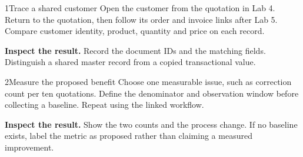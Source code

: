 
\begin{labquestion}{1}{Trace a shared customer}
Open the customer from the quotation in Lab 4. Return to the quotation, then follow its order and invoice links after Lab 5. Compare customer identity, product, quantity and price on each record.
\end{labquestion}
\begin{labanswer}\textbf{Inspect the result.} Record the document IDs and the matching fields. Distinguish a shared master record from a copied transactional value.\end{labanswer}

\begin{labquestion}{2}{Measure the proposed benefit}
Choose one measurable issue, such as correction count per ten quotations. Define the denominator and observation window before collecting a baseline. Repeat using the linked workflow.
\end{labquestion}
\begin{labanswer}\textbf{Inspect the result.} Show the two counts and the process change. If no baseline exists, label the metric as proposed rather than claiming a measured improvement.\end{labanswer}
